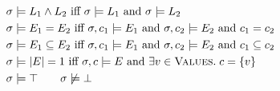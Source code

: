 \begin{align*}
  & \sigma \models L_1 \wedge L_2 \textrm{ iff } \sigma \models L_1 \textrm{ and } \sigma \models L_2 \\
  & \sigma \models E_1 = E_2 \textrm{ iff } \sigma, c_1 \models E_1 \textrm{ and } \sigma, c_2 \models E_2 \textrm{ and } c_1 = c_2 \\
  & \sigma \models E_1 \subseteq E_2 \textrm{ iff } \sigma, c_1 \models E_1 \textrm{ and } \sigma, c_2 \models E_2 \textrm{ and } c_1 \subseteq c_2 \\
  & \sigma \models |{E}| = 1 \textrm{ iff } \sigma, c \models E \textrm{ and } \exists v \in \textsc{Values}. \; c = \{v\} \\
  & \sigma \models \top \qquad \sigma \not\models \bot
\end{align*}
